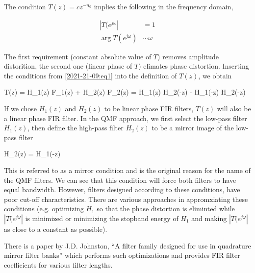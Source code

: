 The condition $T(z) = c z^{-n_0}$ implies the following in the frequency domain,

\begin{align*}
  |T(e^{j \omega}| &= 1 \\
  \arg T(e^{j \omega}) &\sim \omega 
\end{align*}

The first requirement (constant absolute value of $T$) removes amplitude distorition, the second one (linear phase of $T$) elimates phase distortion. Inserting the conditions from \eqref{2021-21-09:eq1} into the definition of $T(z)$, we obtain

\bee
T(z) = H_1(z) F_1(z) + H_2(z) F_2(z) = H_1(z) H_2(-z) - H_1(-z) H_2(-z)
\eee

If we chose $H_1(z)$ and $H_2(z)$ to be linear phase FIR filters, $T(z)$ will also be a linear phase FIR filter. In the QMF approach, we first select the low-pass filter $H_1(z)$, then define the high-pass filter $H_2(z)$ to be a mirror image of the low-pass filter

\bee
H_2(z) = H_1(-z)
\eee

This is referred to as a mirror condition and is the original reason for the name of the QMF filters. We can see that this condition will force both filters to have equal bandwidth. However, filters designed according to these conditions, have poor cut-off characteristics. There are various approaches in appromxiating these conditions (e.g. optimizing $H_1$ so that the phase distortion is eliminted while $|T(e^{j \omega}|$ is minimized or minimizing the stopband energy of $H_1$ and making $|T(e^{j \omega}|$ as close to a constant as possible).

There is a paper by J.D. Johnston, ``A filter family designed for use in quadrature mirror filter banks'' which performs such optimizations and provides FIR filter coefficients for various filter lengths.


